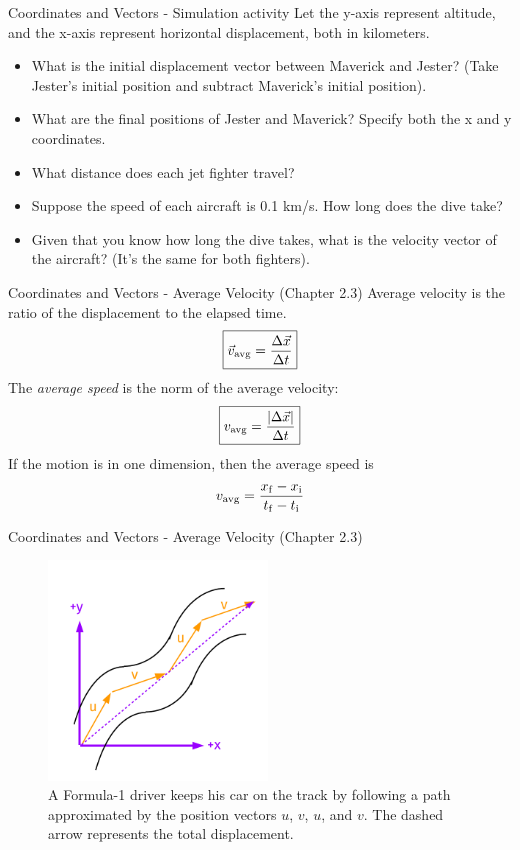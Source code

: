 \documentclass{beamer}
\begin{document}
\begin{frame}{Coordinates and Vectors - Simulation activity}
\small
Let the y-axis represent altitude, and the x-axis represent horizontal displacement, both in kilometers.
\begin{itemize}
\item What is the initial displacement vector between Maverick and Jester? (Take Jester's initial position and subtract Maverick's initial position).
\item What are the final positions of Jester and Maverick?  Specify both the x and y coordinates.
\item What distance does each jet fighter travel?
\item Suppose the speed of each aircraft is 0.1 km/s.  How long does the dive take?
\item Given that you know how long the dive takes, what is the velocity vector of the aircraft?  (It's the same for both fighters).
\end{itemize}
\end{frame}

\begin{frame}{Coordinates and Vectors - Average Velocity  (Chapter 2.3)}
\alert{Average velocity} is the ratio of the \alert{displacement} to the elapsed time.\\
\begin{equation}
\boxed{\vec{v}_{\rm avg} = \frac{\Delta \vec{x}}{\Delta t}}
\end{equation}
The \textit{average speed} is the norm of the average velocity:
\begin{equation}
\boxed{v_{\rm avg} = \frac{|\Delta \vec{x}|}{\Delta t}}
\end{equation}
If the motion is in one dimension, then the average speed is
\begin{equation}
v_{\rm avg} = \frac{x_{\rm f} - x_{\rm i}}{t_{\rm f} - t_{\rm i}}
\end{equation}
\end{frame}

\begin{frame}{Coordinates and Vectors - Average Velocity (Chapter 2.3)}
\begin{figure}
\centering
\includegraphics[width=0.52\textwidth]{figures/AveVelocity.pdf}
\caption{\label{fig:avevel} A Formula-1 driver keeps his car on the track by following a path approximated by the position vectors $u$, $v$, $u$, and $v$.  The dashed arrow represents the total displacement.}
\end{figure}
\end{frame}
\end{document}
